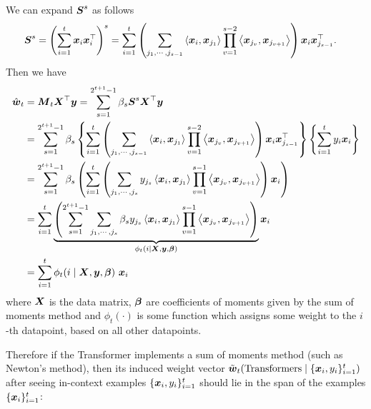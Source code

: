 We can expand $\boldsymbol{S}^s$ as follows
\begin{equation}
    \begin{aligned}
        \boldsymbol{S}^s &= \left(\sum_{i=1}^t \boldsymbol{x}_i \boldsymbol{x}_i^\top\right)^s = \sum_{i=1}^t \left(\sum_{{j_1}, \cdots, {j_{s-1}}} \left\langle {\boldsymbol{x}_i, \boldsymbol{x}_{j_1}} \right\rangle \prod_{v=1}^{s-2} \left\langle {\boldsymbol{x}_{j_{v}}, \boldsymbol{x}_{j_{v+1}}} \right\rangle\right) \boldsymbol{x}_i \boldsymbol{x}_{j_{s-1}}^\top. 
    \end{aligned}
\end{equation}
Then we have 
\begin{equation}
    \begin{aligned}
        \hat{\boldsymbol{w}}_t &=\boldsymbol{M}_t \boldsymbol{X}^\top \boldsymbol{y}  = \sum_{s=1}^{2^{t+1} - 1} \beta_s \boldsymbol{S}^s \boldsymbol{X}^\top \boldsymbol{y}  \\
        &=  \sum_{s=1}^{2^{t+1} - 1} \beta_s \left\{\sum_{i=1}^t \left(\sum_{{j_1}, \cdots, {j_{s-1}}} \left\langle {\boldsymbol{x}_i, \boldsymbol{x}_{j_1}} \right\rangle \prod_{v=1}^{s-2} \left\langle {\boldsymbol{x}_{j_{v}}, \boldsymbol{x}_{j_{v+1}}} \right\rangle\right) \boldsymbol{x}_i \boldsymbol{x}_{j_{s-1}}^\top \right\} \left\{\sum_{i=1}^t y_i \boldsymbol{x}_i \right\} \\
        &= \sum_{s=1}^{2^{t+1} - 1} \beta_s \left(\sum_{i=1}^t \left(\sum_{{j_1}, \cdots, {j_{s}}} y_{j_s} \left\langle {\boldsymbol{x}_i, \boldsymbol{x}_{j_1}} \right\rangle \prod_{v=1}^{s-1} \left\langle {\boldsymbol{x}_{j_{v}}, \boldsymbol{x}_{j_{v+1}}} \right\rangle\right) \boldsymbol{x}_i \right) \\
        &= \sum_{i=1}^t \underbrace{\left(\sum_{s=1}^{2^{t+1} - 1} \sum_{{j_1}, \cdots, {j_{s}}}  \beta_s y_{j_s} \left\langle {\boldsymbol{x}_i, \boldsymbol{x}_{j_1}} \right\rangle \prod_{v=1}^{s-1} \left\langle {\boldsymbol{x}_{j_{v}}, \boldsymbol{x}_{j_{v+1}}} \right\rangle \right)}_{\phi_t(i \mid \boldsymbol{X}, \boldsymbol{y}, \boldsymbol{\beta})} \boldsymbol{x}_i \\
        &= \sum_{i=1}^t \phi_t(i \mid \boldsymbol{X}, \boldsymbol{y}, \boldsymbol{\beta}) ~ \boldsymbol{x}_i
    \end{aligned}
\end{equation}
where $\boldsymbol{X}$ is  the data matrix, $\boldsymbol{\beta}$  are coefficients of moments given by the sum of moments method and $\phi_t(\cdot)$ is some function which assigns some weight to the $i$-th datapoint, based on all other datapoints.

Therefore if the Transformer implements a sum of moments method (such as Newton's method), then its induced weight vector $\tilde{\boldsymbol{w}}_t(\mathrm{Transformers} \mid \{\boldsymbol{x}_i, y_i\}_{i=1}^t)$ after seeing in-context examples $\{\boldsymbol{x}_i, y_i\}_{i=1}^t$  should lie in the span of the examples $\{\boldsymbol{x}_i\}_{i=1}^t$:

